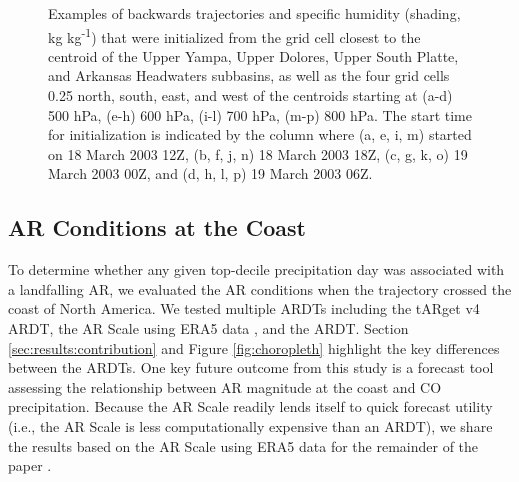 \documentclass[draft]{agujournal2019}
\begin{document}
\begin{figure}
\caption{Examples of backwards trajectories and specific humidity (shading, kg kg\textsuperscript{-1}) that were initialized from the grid cell closest to the centroid of the Upper Yampa, Upper Dolores, Upper South Platte, and Arkansas Headwaters subbasins, as well as the four grid cells 0.25\textdegree{} north, south, east, and west of the centroids starting at (a-d) 500 hPa, (e-h) 600 hPa, (i-l) 700 hPa, (m-p) 800 hPa. The start time for initialization is indicated by the column where (a, e, i, m) started on 18 March 2003 12Z, (b, f, j, n) 18 March 2003 18Z, (c, g, k, o) 19 March 2003 00Z, and (d, h, l, p) 19 March 2003 06Z.}
\label{fig:sensitivity_tests}
\end{figure}

\subsection{AR Conditions at the Coast}
\label{sec:methods:ar_conditions}
To determine whether any given top-decile precipitation day was associated with a landfalling AR, we evaluated the AR conditions when the trajectory crossed the coast of North America. We tested multiple ARDTs including the  tARget v4 ARDT, the AR Scale using ERA5 data \cite{MartinRalph2019}, and the  ARDT. Section \ref{sec:results:contribution} and Figure \ref{fig:choropleth} highlight the key differences between the ARDTs. One key future outcome from this study is a forecast tool assessing the relationship between AR magnitude at the coast and CO precipitation. Because the AR Scale readily lends itself to quick forecast utility (i.e., the AR Scale is less computationally expensive than an ARDT), we share the results based on the AR Scale using ERA5 data for the remainder of the paper \cite{MartinRalph2019}.
\end{document}
